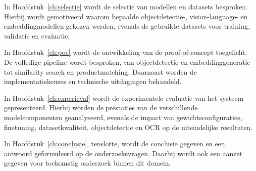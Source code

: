 In Hoofdstuk~\ref{ch:selectie} wordt de selectie van modellen en datasets besproken. Hierbij wordt gemotiveerd waarom bepaalde objectdetectie-, vision-language- en embeddingmodellen gekozen werden, evenals de gebruikte datasets voor training, validatie en evaluatie.

In Hoofdstuk~\ref{ch:poc} wordt de ontwikkeling van de proof-of-concept toegelicht. De volledige pipeline wordt besproken, van objectdetectie en embeddinggeneratie tot similarity search en productmatching. Daarnaast worden de implementatiekeuzes en technische uitdagingen behandeld.

In Hoofdstuk~\ref{ch:experieval} wordt de experimentele evaluatie van het systeem gepresenteerd. Hierbij worden de prestaties van de verschillende modelcomponenten geanalyseerd, evenals de impact van gewichtsconfiguraties, finetuning, datasetkwaliteit, objectdetectie en OCR op de uiteindelijke resultaten.

In Hoofdstuk~\ref{ch:conclusie}, tenslotte, wordt de conclusie gegeven en een antwoord geformuleerd op de onderzoeksvragen. Daarbij wordt ook een aanzet gegeven voor toekomstig onderzoek binnen dit domein.